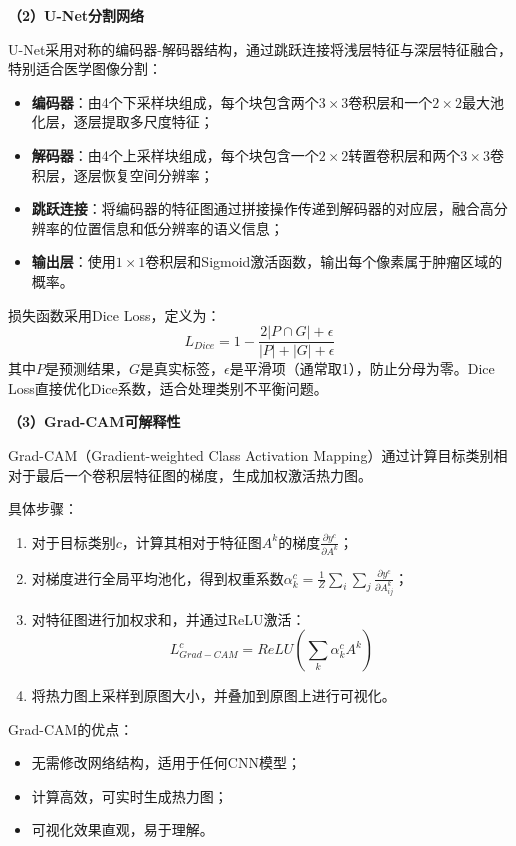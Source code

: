 \documentclass[supercite]{Hust-undergraduate-kaiti}
\theoremstyle{definition}
\begin{document}
\textbf{（2）U-Net分割网络}

U-Net采用对称的编码器-解码器结构，通过跳跃连接将浅层特征与深层特征融合，特别适合医学图像分割：

\begin{itemize}
    \item \textbf{编码器}：由4个下采样块组成，每个块包含两个$3\times3$卷积层和一个$2\times2$最大池化层，逐层提取多尺度特征；
    \item \textbf{解码器}：由4个上采样块组成，每个块包含一个$2\times2$转置卷积层和两个$3\times3$卷积层，逐层恢复空间分辨率；
    \item \textbf{跳跃连接}：将编码器的特征图通过拼接操作传递到解码器的对应层，融合高分辨率的位置信息和低分辨率的语义信息；
    \item \textbf{输出层}：使用$1\times1$卷积层和Sigmoid激活函数，输出每个像素属于肿瘤区域的概率。
\end{itemize}

损失函数采用Dice Loss，定义为：
$$L_{Dice} = 1 - \frac{2|P \cap G| + \epsilon}{|P| + |G| + \epsilon}$$
其中$P$是预测结果，$G$是真实标签，$\epsilon$是平滑项（通常取1），防止分母为零。Dice Loss直接优化Dice系数，适合处理类别不平衡问题。

\textbf{（3）Grad-CAM可解释性}

Grad-CAM（Gradient-weighted Class Activation Mapping）通过计算目标类别相对于最后一个卷积层特征图的梯度，生成加权激活热力图。

具体步骤：
\begin{enumerate}
    \item 对于目标类别$c$，计算其相对于特征图$A^k$的梯度$\frac{\partial y^c}{\partial A^k}$；
    \item 对梯度进行全局平均池化，得到权重系数$\alpha_k^c = \frac{1}{Z}\sum_i\sum_j \frac{\partial y^c}{\partial A_{ij}^k}$；
    \item 对特征图进行加权求和，并通过ReLU激活：
    $$L_{Grad-CAM}^c = ReLU\left(\sum_k \alpha_k^c A^k\right)$$
    \item 将热力图上采样到原图大小，并叠加到原图上进行可视化。
\end{enumerate}

Grad-CAM的优点：
\begin{itemize}
    \item 无需修改网络结构，适用于任何CNN模型；
    \item 计算高效，可实时生成热力图；
    \item 可视化效果直观，易于理解。
\end{itemize}
\end{document}
